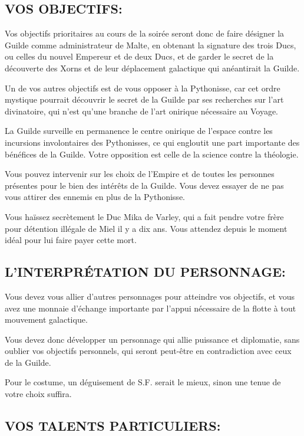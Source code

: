 \documentclass[14pt,twocolumn]{extarticle}
\begin{document}
\subsection{VOS OBJECTIFS:}

Vos objectifs prioritaires au cours de la soirée seront donc de faire désigner
la Guilde comme administrateur de Malte, en obtenant la signature des trois
Ducs, ou celles du nouvel Empereur et de deux Ducs, et de garder le secret de
la découverte des Xorns et de leur déplacement galactique qui anéantirait la
Guilde.

Un de vos autres objectifs est de vous opposer à la Pythonisse, car cet ordre
mystique pourrait découvrir le secret de la Guilde par ses recherches sur l'art
divinatoire, qui n'est qu'une branche de l'art onirique nécessaire au Voyage.

La Guilde surveille en permanence le centre onirique de l'espace contre les
incursions involontaires des Pythonisses, ce qui engloutit une part importante
des bénéfices de la Guilde. Votre opposition est celle de la science contre la
théologie.

Vous pouvez intervenir sur les choix de l'Empire et de toutes les personnes
présentes pour le bien des intérêts de la Guilde. Vous devez essayer de ne pas
vous attirer des ennemis en plus de la Pythonisse.

Vous haïssez secrètement le Duc Mika de Varley, qui a fait pendre votre frère
pour détention illégale de Miel il y a dix ans. Vous attendez depuis le moment
idéal pour lui faire payer cette mort.

\subsection{L'INTERPRÉTATION DU PERSONNAGE:}

Vous devez vous allier d'autres personnages pour atteindre vos objectifs, et
vous avez une monnaie d'échange importante par l'appui nécessaire de la flotte
à tout mouvement galactique.

Vous devez donc développer un personnage qui allie puissance et diplomatie,
sans oublier vos objectifs personnels, qui seront peut-être en contradiction
avec ceux de la Guilde.

Pour le costume, un déguisement de S.F. serait le mieux, sinon une tenue de
votre choix suffira.

\subsection{VOS TALENTS PARTICULIERS:}
\end{document}

